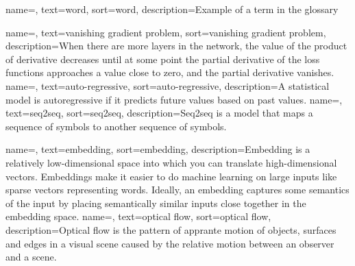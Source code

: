 


{
    name=,
    text=word,
    sort=word,
    description={Example of a term in the glossary}
}

{
    name=,
    text=vanishing gradient problem,
    sort=vanishing gradient problem,
    description={When there are more layers in the network, the value of the product of derivative decreases until at some point the partial derivative of the loss functions approaches a value close to zero, and the partial derivative vanishes.}
}
{
    name=,
    text=auto-regressive,
    sort=auto-regressive,
    description={A statistical  model is autoregressive if it predicts future values based on past values.}
}
{
    name=,
    text=seq2seq,
    sort=seq2seq,
    description={Seq2seq is a model that maps a sequence of symbols to another sequence of symbols.}
}

{
    name=,
    text=embedding,
    sort=embedding,
    description={Embedding is a relatively low-dimensional space into which you can translate high-dimensional vectors. Embeddings make it easier to do machine learning on large inputs like sparse vectors representing words. Ideally, an embedding captures some semantics of the input by placing semantically similar inputs close together in the embedding space.}
}
{
    name=,
    text=optical flow,
    sort=optical flow,
    description={Optical flow is the pattern of apprante motion of objects, surfaces and edges in a visual scene caused by the relative motion between an observer and a scene.}
}
